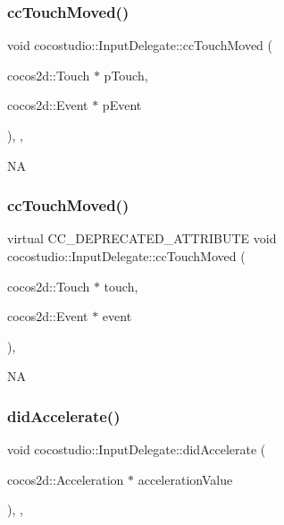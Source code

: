 \subsubsection{\texorpdfstring{cc\+Touch\+Moved()}{ccTouchMoved()}\hspace{0.1cm}{\footnotesize\ttfamily [1/2]}}
{\footnotesize\ttfamily void cocostudio\+::\+Input\+Delegate\+::cc\+Touch\+Moved (\begin{DoxyParamCaption}\item[{cocos2d\+::\+Touch $\ast$}]{p\+Touch,  }\item[{cocos2d\+::\+Event $\ast$}]{p\+Event }\end{DoxyParamCaption})\hspace{0.3cm}{\ttfamily [inline]}, {\ttfamily [final]}, {\ttfamily [virtual]}}

NA \mbox{\label{classcocostudio_1_1InputDelegate_af8fcaa42ab9702ac83134f2941722897}} 
\subsubsection{\texorpdfstring{cc\+Touch\+Moved()}{ccTouchMoved()}\hspace{0.1cm}{\footnotesize\ttfamily [2/2]}}
{\footnotesize\ttfamily virtual C\+C\+\_\+\+D\+E\+P\+R\+E\+C\+A\+T\+E\+D\+\_\+\+A\+T\+T\+R\+I\+B\+U\+TE void cocostudio\+::\+Input\+Delegate\+::cc\+Touch\+Moved (\begin{DoxyParamCaption}\item[{cocos2d\+::\+Touch $\ast$}]{touch,  }\item[{cocos2d\+::\+Event $\ast$}]{event }\end{DoxyParamCaption})\hspace{0.3cm}{\ttfamily [final]}, {\ttfamily [virtual]}}

NA \mbox{\label{classcocostudio_1_1InputDelegate_ae59627e1bc8217fd21157ae550d5748c}} 
\subsubsection{\texorpdfstring{did\+Accelerate()}{didAccelerate()}\hspace{0.1cm}{\footnotesize\ttfamily [1/2]}}
{\footnotesize\ttfamily void cocostudio\+::\+Input\+Delegate\+::did\+Accelerate (\begin{DoxyParamCaption}\item[{cocos2d\+::\+Acceleration $\ast$}]{acceleration\+Value }\end{DoxyParamCaption})\hspace{0.3cm}{\ttfamily [inline]}, {\ttfamily [final]}, {\ttfamily [virtual]}}

